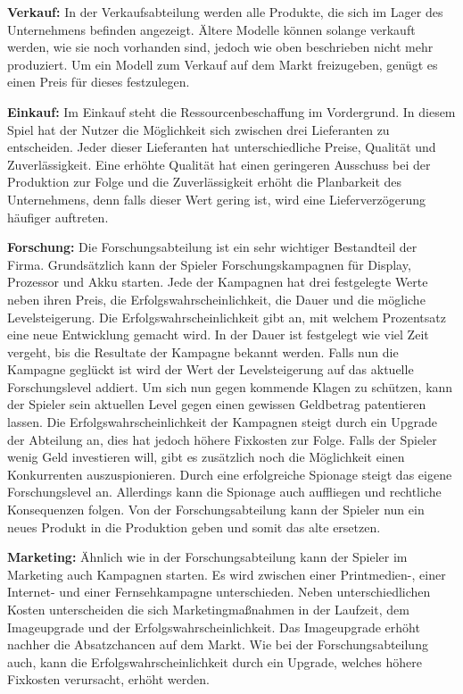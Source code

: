 \textbf{Verkauf:} 
In der Verkaufsabteilung werden alle Produkte, die sich im Lager des Unternehmens befinden angezeigt. Ältere Modelle können solange verkauft werden, wie sie noch vorhanden sind, jedoch wie oben beschrieben nicht mehr produziert. Um ein Modell zum Verkauf auf dem Markt freizugeben, genügt es einen Preis für dieses festzulegen.

\textbf{Einkauf:} 
Im Einkauf steht die Ressourcenbeschaffung im Vordergrund. In diesem Spiel hat der Nutzer die Möglichkeit sich zwischen drei Lieferanten zu entscheiden. Jeder dieser Lieferanten hat unterschiedliche Preise, Qualität und Zuverlässigkeit. Eine erhöhte Qualität hat einen geringeren Ausschuss bei der Produktion zur Folge und die Zuverlässigkeit erhöht die Planbarkeit des Unternehmens, denn falls dieser Wert gering ist, wird eine Lieferverzögerung häufiger auftreten.

\textbf{Forschung:} 
Die Forschungsabteilung ist ein sehr wichtiger Bestandteil der Firma. Grundsätzlich kann der Spieler Forschungskampagnen für Display, Prozessor und Akku starten. Jede der Kampagnen hat drei festgelegte Werte neben ihren Preis, die Erfolgswahrscheinlichkeit, die Dauer und die mögliche Levelsteigerung. Die Erfolgswahrscheinlichkeit gibt an, mit welchem Prozentsatz  eine neue Entwicklung gemacht wird. In der Dauer ist festgelegt wie viel Zeit vergeht, bis die Resultate der Kampagne bekannt werden. Falls nun die Kampagne geglückt ist wird der Wert der Levelsteigerung auf das aktuelle Forschungslevel addiert. Um sich nun gegen kommende Klagen zu schützen, kann der Spieler sein aktuellen Level gegen einen gewissen Geldbetrag patentieren lassen. Die Erfolgswahrscheinlichkeit der Kampagnen steigt durch ein Upgrade der Abteilung an, dies hat jedoch höhere Fixkosten zur Folge. Falls der Spieler wenig Geld investieren will, gibt es zusätzlich noch die Möglichkeit einen Konkurrenten auszuspionieren. Durch eine erfolgreiche Spionage steigt das eigene Forschungslevel an. Allerdings kann die Spionage auch auffliegen und rechtliche Konsequenzen folgen. Von der Forschungsabteilung kann der Spieler nun ein neues Produkt in die Produktion geben und somit das alte ersetzen.

\textbf{Marketing: }
Ähnlich wie in der Forschungsabteilung kann der Spieler im Marketing auch Kampagnen starten. Es wird zwischen einer Printmedien-, einer Internet- und einer Fernsehkampagne unterschieden. Neben unterschiedlichen Kosten unterscheiden die sich Marketingmaßnahmen in der Laufzeit, dem Imageupgrade und der Erfolgswahrscheinlichkeit. Das Imageupgrade erhöht nachher die Absatzchancen auf dem Markt. Wie bei der Forschungsabteilung auch, kann die Erfolgswahrscheinlichkeit durch ein Upgrade, welches höhere Fixkosten verursacht, erhöht werden.

